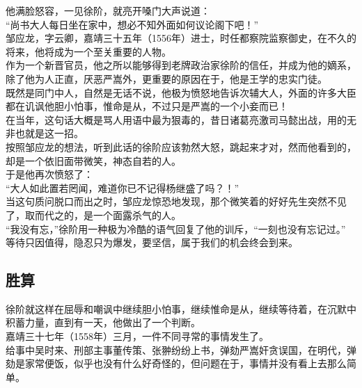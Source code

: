 \begin{multicols}{\theparacolNo}
他满脸怒容，一见徐阶，就亮开嗓门大声说道：\\

“尚书大人每日坐在家中，想必不知外面如何议论阁下吧！”\\

邹应龙，字云卿，嘉靖三十五年（1556年）进士，时任都察院监察御史，在不久的将来，他将成为一个至关重要的人物。\\

作为一个新晋官员，他之所以能够得到老牌政治家徐阶的信任，并成为他的嫡系，除了他为人正直，厌恶严嵩外，更重要的原因在于，他是王学的忠实门徒。\\

既然是同门中人，自然是无话不说，他极为愤怒地告诉次辅大人，外面的许多大臣都在讥讽他胆小怕事，惟命是从，不过只是严嵩的一个小妾而已！\\

在当年，这句话大概是骂人用语中最为狠毒的，昔日诸葛亮激司马懿出战，用的无非也就是这一招。\\

按照邹应龙的想法，听到此话的徐阶应该勃然大怒，跳起来才对，然而他看到的，却是一个依旧面带微笑，神态自若的人。\\

于是他再次愤怒了：\\

“大人如此置若罔闻，难道你已不记得杨继盛了吗？！”\\

当这句质问脱口而出之时，邹应龙惊恐地发现，那个微笑着的好好先生突然不见了，取而代之的，是一个面露杀气的人。\\

“我没有忘，”徐阶用一种极为冷酷的语气回复了他的训斥，“一刻也没有忘记过。”\\

等待只因值得，隐忍只为爆发，要坚信，属于我们的机会终会到来。\\

\subsection{胜算}
徐阶就这样在屈辱和嘲讽中继续胆小怕事，继续惟命是从，继续等待着，在沉默中积蓄力量，直到有一天，他做出了一个判断。\\

嘉靖三十七年（1558年）三月，一件不同寻常的事情发生了。\\

给事中吴时来、刑部主事董传策、张翀纷纷上书，弹劾严嵩奸贪误国，在明代，弹劾是家常便饭，似乎也没有什么好奇怪的，但问题在于，事情并没有看上去那么简单。\\


\end{multicols}
